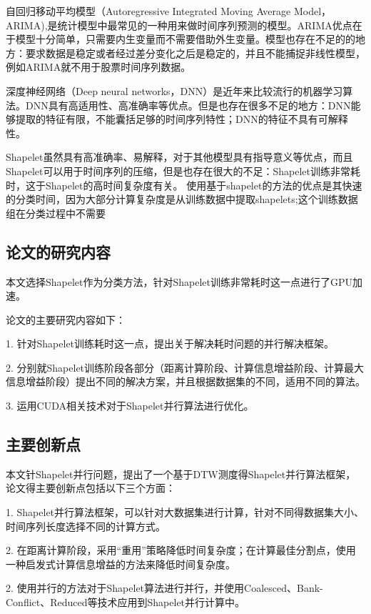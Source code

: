自回归移动平均模型（Autoregressive Integrated Moving Average Model，ARIMA),是统计模型中最常见的一种用来做时间序列预测的模型。ARIMA优点在于模型十分简单，只需要内生变量而不需要借助外生变量。模型也存在不足的的地方：要求数据是稳定或者经过差分变化之后是稳定的，并且不能捕捉非线性模型，例如ARIMA就不用于股票时间序列数据。

深度神经网络（Deep neural networks，DNN）是近年来比较流行的机器学习算法。DNN具有高适用性、高准确率等优点。但是也存在很多不足的地方：DNN能够提取的特征有限，不能囊括足够的时间序列特性；DNN的特征不具有可解释性。

Shapelet虽然具有高准确率、易解释，对于其他模型具有指导意义等优点，而且Shapelet可以用于时间序列的压缩，但是也存在很大的不足：Shapelet训练非常耗时，这于Shapelet的高时间复杂度有关。
使用基于shapelet的方法的优点是其快速的分类时间，因为大部分计算复杂度是从训练数据中提取shapelets;这个训练数据组在分类过程中不需要





\subsection{论文的研究内容}

本文选择Shapelet作为分类方法，针对Shapelet训练非常耗时这一点进行了GPU加速。

论文的主要研究内容如下：

1. 针对Shapelet训练耗时这一点，提出关于解决耗时问题的并行解决框架。

2. 分别就Shapelet训练阶段各部分（距离计算阶段、计算信息增益阶段、计算最大信息增益阶段）提出不同的解决方案，并且根据数据集的不同，适用不同的算法。

3. 运用CUDA相关技术对于Shapelet并行算法进行优化。


\subsection{主要创新点}

本文针Shapelet并行问题，提出了一个基于DTW测度得Shapelet并行算法框架，论文得主要创新点包括以下三个方面：

1. Shapelet并行算法框架，可以针对大数据集进行计算，针对不同得数据集大小、时间序列长度选择不同的计算方式。

2. 在距离计算阶段，采用“重用”策略降低时间复杂度；在计算最佳分割点，使用一种启发式计算信息增益的方法来降低时间复杂度。

2. 使用并行的方法对于Shapelet算法进行并行，并使用Coalesced、Bank-Conflict、Reduced等技术应用到Shapelet并行计算中。



